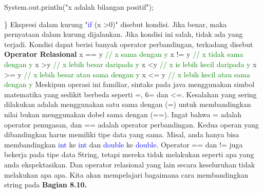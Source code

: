 System.out.println("x adalah bilangan positif");
\par
\}
\newline
\newline
Ekspresi dalam kurung "\textcolor{blue}{if} (x \textgreater 0)" disebut kondisi. Jika benar, maka pernyataan dalam kurung dijalankan. Jika kondisi ini salah, tidak ada yang terjadi.
\newline
\newline
Kondisi dapat berisi banyak operator perbandingan, terkadang disebut \textbf{Operator Relasional}
\newline
\newline
x == y \textcolor{green}{// x sama dengan y}
\newline
x != y \textcolor{green}{// x tidak sama dengan y}
\newline
x \textgreater y \textcolor{green}{// x lebih besar daripada y}
\newline
x \textless y \textcolor{green}{// x is lebih kecil daripada y}
\newline
x \textgreater= y \textcolor{green}{// x lebih besar atau sama dengan y}
\newline
x \textless= y \textcolor{green}{// x lebih kecil atau sama dengan y}
\newline
\newline
Meskipun operasi ini familiar, sintaks pada java menggunakan simbol matematika yang sedikit berbeda seperti =, 6= dan \textless=. Kesalahan yang sering dilakukan adalah menggunakan satu sama dengan (=) untuk membandingkan nilai bukan menggunakan dobel sama dengan (==). Ingat bahwa  = adalah operator penugasan, dan == adalah operator perbandingan.
\newline
\newline
Kedua operan yang dibandingkan harus memiliki tipe data yang sama. Misal, anda hanya bisa membandingkan \textcolor{blue}{int} ke \textcolor{blue}{int} dan \textcolor{blue}{double} ke \textcolor{blue}{double}.
\newline
Operator == dan != juga bekerja pada tipe data String, tetapi mereka tidak melakukan seperti apa yang anda ekspektasikan. Dan operator relasional yang lain secara keseluruhan tidak melakukan apa apa. Kita akan mempelajari bagaimana cara membandingkan string pada \textbf{Bagian 8.10.}
\newline
